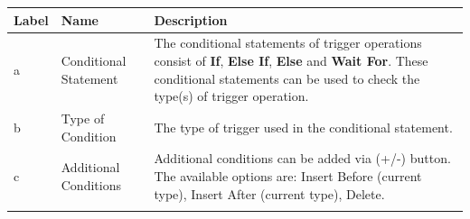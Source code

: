 \begin{enumerate}
  \begin{longtable}[]{@{}|l|l|l|@{}}
  \toprule
  \begin{minipage}[b]{0.08\columnwidth}\raggedright
{\bf{Label}}\strut
  \end{minipage} & \begin{minipage}[b]{0.22\columnwidth}\raggedright
{\bf{Name}}\strut
  \end{minipage} & \begin{minipage}[b]{0.62\columnwidth}\raggedright
{\bf{Description}}\strut
  \end{minipage}\tabularnewline
  \midrule
  \endhead
  \begin{minipage}[t]{0.08\columnwidth}\raggedright
  a\strut
  \end{minipage} & \begin{minipage}[t]{0.22\columnwidth}\raggedright
  Conditional Statement\strut
  \end{minipage} & \begin{minipage}[t]{0.62\columnwidth}\raggedright
  The conditional statements of trigger operations consist of
  \textbf{If}, \textbf{Else If}, \textbf{Else} and \textbf{Wait For}.
  These conditional statements can be used to check the type(s) of
  trigger operation.\strut
  \end{minipage}\tabularnewline
  \begin{minipage}[t]{0.08\columnwidth}\raggedright
  b\strut
  \end{minipage} & \begin{minipage}[t]{0.22\columnwidth}\raggedright
  Type of Condition\strut
  \end{minipage} & \begin{minipage}[t]{0.62\columnwidth}\raggedright
  The type of trigger used in the conditional statement.\strut
  \end{minipage}\tabularnewline
  \begin{minipage}[t]{0.08\columnwidth}\raggedright
  c\strut
  \end{minipage} & \begin{minipage}[t]{0.22\columnwidth}\raggedright
  Additional Conditions\strut
  \end{minipage} & \begin{minipage}[t]{0.62\columnwidth}\raggedright
  Additional conditions can be added via (+/-) button. The available
  options are: Insert Before (current type), Insert After (current
  type), Delete.\strut
  \end{minipage}\tabularnewline
  \begin{minipage}[t]{0.08\columnwidth}\raggedright

\end{minipage}
\end{longtable}
\end{enumerate}
